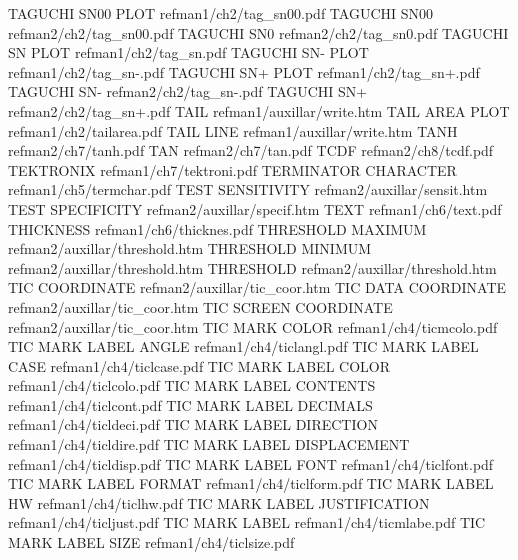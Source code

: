 TAGUCHI SN00 PLOT                       refman1/ch2/tag_sn00.pdf
TAGUCHI SN00                            refman2/ch2/tag_sn00.pdf
TAGUCHI SN0                             refman2/ch2/tag_sn0.pdf
TAGUCHI SN PLOT                         refman1/ch2/tag_sn.pdf
TAGUCHI SN- PLOT                        refman1/ch2/tag_sn-.pdf
TAGUCHI SN+ PLOT                        refman1/ch2/tag_sn+.pdf
TAGUCHI SN-                             refman2/ch2/tag_sn-.pdf
TAGUCHI SN+                             refman2/ch2/tag_sn+.pdf
TAIL                                    refman1/auxillar/write.htm
TAIL AREA PLOT                          refman1/ch2/tailarea.pdf
TAIL LINE                               refman1/auxillar/write.htm
TANH                                    refman2/ch7/tanh.pdf
TAN                                     refman2/ch7/tan.pdf
TCDF                                    refman2/ch8/tcdf.pdf
TEKTRONIX                               refman1/ch7/tektroni.pdf
TERMINATOR CHARACTER                    refman1/ch5/termchar.pdf
TEST SENSITIVITY                        refman2/auxillar/sensit.htm
TEST SPECIFICITY                        refman2/auxillar/specif.htm
TEXT                                    refman1/ch6/text.pdf
THICKNESS                               refman1/ch6/thicknes.pdf
THRESHOLD MAXIMUM                       refman2/auxillar/threshold.htm
THRESHOLD MINIMUM                       refman2/auxillar/threshold.htm
THRESHOLD                               refman2/auxillar/threshold.htm
TIC COORDINATE                          refman2/auxillar/tic_coor.htm
TIC DATA COORDINATE                     refman2/auxillar/tic_coor.htm
TIC SCREEN COORDINATE                   refman2/auxillar/tic_coor.htm
TIC MARK COLOR                          refman1/ch4/ticmcolo.pdf
TIC MARK LABEL ANGLE                    refman1/ch4/ticlangl.pdf
TIC MARK LABEL CASE                     refman1/ch4/ticlcase.pdf
TIC MARK LABEL COLOR                    refman1/ch4/ticlcolo.pdf
TIC MARK LABEL CONTENTS                 refman1/ch4/ticlcont.pdf
TIC MARK LABEL DECIMALS                 refman1/ch4/ticldeci.pdf
TIC MARK LABEL DIRECTION                refman1/ch4/ticldire.pdf
TIC MARK LABEL DISPLACEMENT             refman1/ch4/ticldisp.pdf
TIC MARK LABEL FONT                     refman1/ch4/ticlfont.pdf
TIC MARK LABEL FORMAT                   refman1/ch4/ticlform.pdf
TIC MARK LABEL HW                       refman1/ch4/ticlhw.pdf
TIC MARK LABEL JUSTIFICATION            refman1/ch4/ticljust.pdf
TIC MARK LABEL                          refman1/ch4/ticmlabe.pdf
TIC MARK LABEL SIZE                     refman1/ch4/ticlsize.pdf
